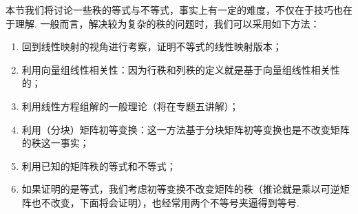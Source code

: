 本节我们将讨论一些秩的等式与不等式，事实上有一定的难度，不仅在于技巧也在于理解. 一般而言，解决较为复杂的秩的问题时，我们可以采用如下方法：
\begin{enumerate}
    \item 回到线性映射的视角进行考察，证明不等式的线性映射版本；

    \item 利用向量组线性相关性：因为行秩和列秩的定义就是基于向量组线性相关性的；

    \item 利用线性方程组解的一般理论（将在专题五讲解）；

    \item 利用（分块）矩阵初等变换：这一方法基于分块矩阵初等变换也是不改变矩阵的秩这一事实；

    \item 利用已知的矩阵秩的等式和不等式；

    \item 如果证明的是等式，我们考虑初等变换不改变矩阵的秩（推论就是乘以可逆矩阵也不改变，下面将会证明），也经常用两个不等号夹逼得到等号.
\end{enumerate}

